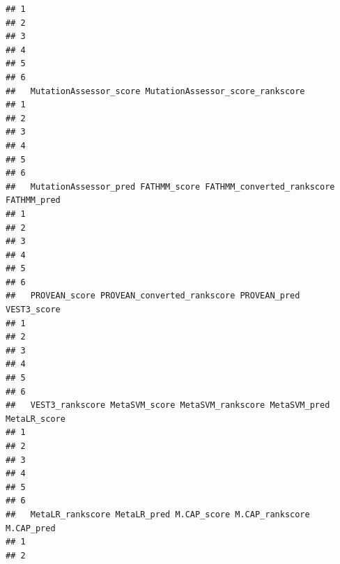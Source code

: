 \documentclass[
]{article}
\begin{document}
\begin{verbatim}
## 1                                                       
## 2                                                       
## 3                                                       
## 4                                                       
## 5                                                       
## 6                                                       
##   MutationAssessor_score MutationAssessor_score_rankscore
## 1                                                        
## 2                                                        
## 3                                                        
## 4                                                        
## 5                                                        
## 6                                                        
##   MutationAssessor_pred FATHMM_score FATHMM_converted_rankscore FATHMM_pred
## 1                                                                          
## 2                                                                          
## 3                                                                          
## 4                                                                          
## 5                                                                          
## 6                                                                          
##   PROVEAN_score PROVEAN_converted_rankscore PROVEAN_pred VEST3_score
## 1                                                                   
## 2                                                                   
## 3                                                                   
## 4                                                                   
## 5                                                                   
## 6                                                                   
##   VEST3_rankscore MetaSVM_score MetaSVM_rankscore MetaSVM_pred MetaLR_score
## 1                                                                          
## 2                                                                          
## 3                                                                          
## 4                                                                          
## 5                                                                          
## 6                                                                          
##   MetaLR_rankscore MetaLR_pred M.CAP_score M.CAP_rankscore M.CAP_pred
## 1                                                                    
## 2                                                                    

\end{verbatim}
\end{document}
